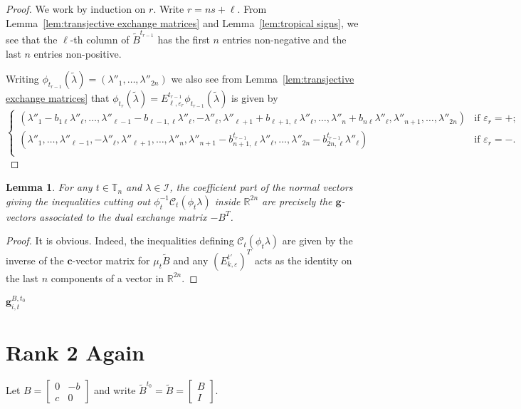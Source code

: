 \documentclass{amsart}
\newtheorem{lemma}[theorem]{Lemma}
\numberwithin{theorem}{section}
\newcommand{\bfc}{\boldsymbol{c}}
\newcommand{\bfg}{\boldsymbol{g}}
\newcommand{\cC}{\mathcal{C}}
\newcommand{\cI}{\mathcal{I}}
\newcommand{\RR}{\mathbb{R}}
\newcommand{\TT}{\mathbb{T}}
\begin{document}
  \begin{proof}
    We work by induction on $r$.
    Write $r=ns+\ell$.
    From Lemma~\ref{lem:transjective exchange matrices} and Lemma~\ref{lem:tropical signs}, we see that the $\ell$-th column of $\tilde B^{t_{r-1}}$ has the first $n$ entries non-negative and the last $n$ entries non-positive.

    Writing $\phi_{t_{r-1}}(\tilde\lambda)=(\lambda''_1,\ldots,\lambda''_{2n})$ we also see from Lemma~\ref{lem:transjective exchange matrices} that $\phi_{t_r}(\tilde\lambda)=E^{t_{r-1}}_{\ell,\varepsilon_r}\phi_{t_{r-1}}(\tilde\lambda)$ is given by
    \[
      \begin{cases}
        (\lambda''_1-b_{1\ell}\lambda''_\ell,\ldots,\lambda''_{\ell-1}-b_{\ell-1,\ell}\lambda''_\ell,-\lambda''_\ell,\lambda''_{\ell+1}+b_{\ell+1,\ell}\lambda''_\ell,\ldots,\lambda''_n+b_{n\ell}\lambda''_\ell,\lambda''_{n+1},\ldots,\lambda''_{2n}) & \text{if $\varepsilon_r=+$;}\\
        (\lambda''_1,\ldots,\lambda''_{\ell-1},-\lambda''_\ell,\lambda''_{\ell+1},\ldots,\lambda''_n,\lambda''_{n+1}-b^{t_{r-1}}_{n+1,\ell}\lambda''_\ell,\ldots,\lambda''_{2n}-b^{t_{r-1}}_{2n,\ell}\lambda''_\ell) & \text{if $\varepsilon_r=-$.}\\
      \end{cases}
    \]
  \end{proof}

  \begin{lemma}
    For any $t\in\TT_n$ and $\lambda\in\cI$, the coefficient part of the normal vectors giving the inequalities cutting out $\phi_t^{-1}\cC_t(\phi_t\lambda)$ inside $\RR^{2n}$ are precisely the $\bfg$-vectors associated to the dual exchange matrix $-B^T$.
  \end{lemma}
  \begin{proof}
    It is obvious.
    Indeed, the inequalities defining $\cC_t(\phi_t\lambda)$ are given by the inverse of the $\bfc$-vector matrix for $\mu_t\tilde B$ and any $(E^{t'}_{k,\varepsilon})^T$ acts as the identity on the last $n$ components of a vector in $\RR^{2n}$.
  \end{proof}

  $\bfg^{B,t_0}_{i,t}$

\section{Rank 2 Again}
  Let $B=\left[\begin{array}{cc} 0 & -b \\ c & 0\end{array}\right]$ and write $\tilde B^{t_0}=\tilde B=\left[\begin{array}{c} B\\ I\end{array}\right]$.
  
\end{document}
